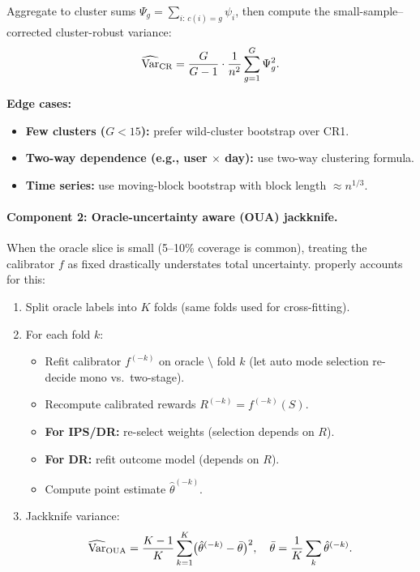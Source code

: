 Aggregate to cluster sums $\Psi_g = \sum_{i:\, c(i)=g} \psi_i$, then compute the small-sample--corrected cluster-robust variance:
\begin{equation}
\widehat{\operatorname{Var}}_{\text{CR}} = \frac{G}{G-1} \cdot \frac{1}{n^2} \sum_{g=1}^G \Psi_g^2.
\end{equation}

\textbf{Edge cases:}
\begin{itemize}
\item \textbf{Few clusters ($G < 15$):} prefer wild-cluster bootstrap over CR1.
\item \textbf{Two-way dependence (e.g., user $\times$ day):} use two-way clustering formula.
\item \textbf{Time series:} use moving-block bootstrap with block length $\approx n^{1/3}$.
\end{itemize}

\paragraph{Component 2: Oracle-uncertainty aware (OUA) jackknife.}

When the oracle slice is small (5--10\% coverage is common), treating the calibrator $f$ as fixed drastically understates total uncertainty. \oua{} properly accounts for this:

\begin{enumerate}
\item Split oracle labels into $K$ folds (same folds used for cross-fitting).
\item For each fold $k$:
\begin{itemize}
\item Refit calibrator $f^{(-k)}$ on oracle $\setminus$ fold $k$ (let auto mode selection re-decide mono vs.\ two-stage).
\item Recompute calibrated rewards $R^{(-k)} = f^{(-k)}(S)$.
\item \textbf{For IPS/DR:} re-select \simcal{} weights (selection depends on $R$).
\item \textbf{For DR:} refit outcome model (depends on $R$).
\item Compute point estimate $\hat{\theta}^{(-k)}$.
\end{itemize}
\item Jackknife variance:
\begin{equation}
\widehat{\operatorname{Var}}_{\text{OUA}} = \frac{K-1}{K} \sum_{k=1}^K \bigl(\hat{\theta}^{(-k)} - \bar{\theta}\bigr)^2, \quad \bar{\theta} = \frac{1}{K}\sum_k \hat{\theta}^{(-k)}.
\end{equation}
\end{enumerate}

